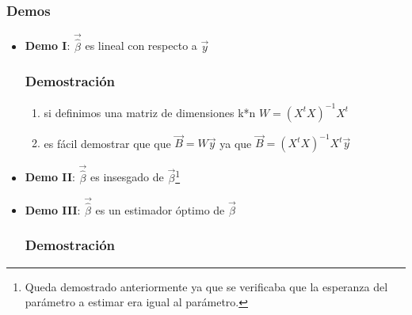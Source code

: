 \documentclass[a4paper,12pt]{article}
\newcommand{\betaEstimada}{\vec{\hat{\beta}}}
\newcommand{\ecuacion}[1]{\ensuremath{#1}}
\begin{document}
\subsubsection{Demos}
\begin{itemize}
    \item \textbf{Demo I}: \ecuacion{\betaEstimada} es lineal con respecto a \ecuacion{\vec{y}}
    \subsubsection*{Demostración}
    \begin{enumerate}
        \item si definimos una matriz de dimensiones k*n \ecuacion{W = (X^tX)^{-1}X^t}
        \item es fácil demostrar que que \ecuacion{\vec{B} = W\vec{y}} ya que \ecuacion{\vec{B} = (X^tX)^{-1}X^t\vec{y}}
    \end{enumerate}
    \item \textbf{Demo II}: \ecuacion{\betaEstimada} es insesgado de \ecuacion{\vec{\beta}}\footnote{Queda demostrado anteriormente ya que se verificaba que la esperanza del parámetro a estimar era igual al parámetro.}
    \item  \textbf{Demo III}: \ecuacion{\betaEstimada} es un estimador óptimo de \ecuacion{\vec{\beta}}
    \subsubsection*{Demostración}

\end{itemize}
\end{document}
